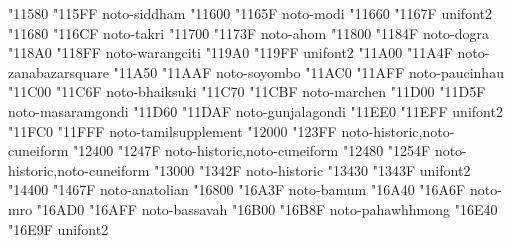 \documentclass{article}
\begin{document}
                                        { "11580} { "115FF} {noto-siddham}
                                           { "11600} { "1165F} {noto-modi}
                           { "11660} { "1167F} {unifont2}
                                          { "11680} { "116CF} {noto-takri}
                                           { "11700} { "1173F} {noto-ahom}
                                          { "11800} { "1184F} {noto-dogra}
                                    { "118A0} { "118FF} {noto-warangciti}
                                    { "119A0} { "119FF} {unifont2}
                               { "11A00} { "11A4F} {noto-zanabazarsquare}
                                        { "11A50} { "11AAF} {noto-soyombo}
                                    { "11AC0} { "11AFF} {noto-paucinhau}
                                      { "11C00} { "11C6F} {noto-bhaiksuki}
                                        { "11C70} { "11CBF} {noto-marchen}
                                  { "11D00} { "11D5F} {noto-masaramgondi}
                                  { "11D60} { "11DAF} {noto-gunjalagondi}
                                        { "11EE0} { "11EFF} {unifont2}
                               { "11FC0} { "11FFF} {noto-tamilsupplement}
                                      { "12000} { "123FF} {noto-historic,noto-cuneiform}
              { "12400} { "1247F} {noto-historic,noto-cuneiform}
                       { "12480} { "1254F} {noto-historic,noto-cuneiform}
                           { "13000} { "1342F} {noto-historic}
            { "13430} { "1343F} {unifont2}
                          { "14400} { "1467F} {noto-anatolian}
                               { "16800} { "16A3F} {noto-bamum}
                                            { "16A40} { "16A6F} {noto-mro}
                                      { "16AD0} { "16AFF} {noto-bassavah}
                                   { "16B00} { "16B8F} {noto-pahawhhmong}
                                    { "16E40} { "16E9F} {unifont2}
\end{document}

